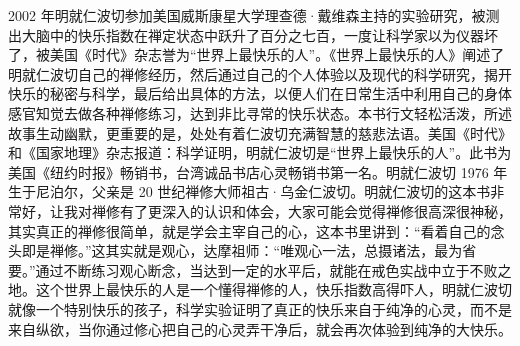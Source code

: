 \begin{book}
    2002 年明就仁波切参加美国威斯康星大学理查德·戴维森主持的实验研究，被测出大脑中的快乐指数在禅定状态中跃升了百分之七百，一度让科学家以为仪器坏了，被美国《时代》杂志誉为“世界上最快乐的人”。《世界上最快乐的人》阐述了明就仁波切自己的禅修经历，然后通过自己的个人体验以及现代的科学研究，揭开快乐的秘密与科学，最后给出具体的方法，以便人们在日常生活中利用自己的身体感官知觉去做各种禅修练习，达到非比寻常的快乐状态。本书行文轻松活泼，所述故事生动幽默，更重要的是，处处有着仁波切充满智慧的慈悲法语。美国《时代》和《国家地理》杂志报道：科学证明，明就仁波切是“世界上最快乐的人”。此书为美国《纽约时报》畅销书，台湾诚品书店心灵畅销书第一名。明就仁波切 1976 年生于尼泊尔，父亲是 20 世纪禅修大师祖古·乌金仁波切。明就仁波切的这本书非常好，让我对禅修有了更深入的认识和体会，大家可能会觉得禅修很高深很神秘，其实真正的禅修很简单，就是学会主宰自己的心，这本书里讲到：“看着自己的念头即是禅修。”这其实就是观心，达摩祖师：“唯观心一法，总摄诸法，最为省要。”通过不断练习观心断念，当达到一定的水平后，就能在戒色实战中立于不败之地。这个世界上最快乐的人是一个懂得禅修的人，快乐指数高得吓人，明就仁波切就像一个特别快乐的孩子，科学实验证明了真正的快乐来自于纯净的心灵，而不是来自纵欲，当你通过修心把自己的心灵弄干净后，就会再次体验到纯净的大快乐。
\end{book}
